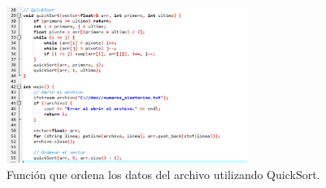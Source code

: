 \documentclass[12pt]{article}
\begin{document}
\begin{figure}[t]
    \centering
    \includegraphics[width=0.7\textwidth]{imagen2.png}
    \caption{Función que ordena los datos del archivo utilizando QuickSort.}
    \label{fig:codigo-quicksort}
\end{figure}
\end{document}
